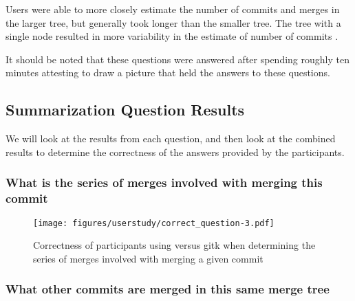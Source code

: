 Users were able to more closely estimate the number of commits and
merges in the larger tree, but generally took longer than the smaller
tree. The tree with a single node resulted in more variability in the
estimate of number of commits .

It should be noted that these questions were answered after spending
roughly ten minutes attesting to draw a picture that held the answers to
these questions.

\subsection{Summarization Question Results}

We will look at the results from each question, and then look at the
combined results to determine the correctness of the answers provided by
the participants.

\subsubsection{What is the series of merges involved with merging this commit}
\label{ssub:what_is_the_series_of_merges_involved_with_merging_this_commit}





\begin{figure}[htpb]
  \centering
  \texttt{[image: figures/userstudy/correct\_question-3.pdf]}
  \caption{Correctness of participants using \tool versus gitk
    when determining the series of merges involved with merging a given
  commit}
  \label{fig:figures/userstudy/correct_question-3}
\end{figure}

\subsubsection{What other commits are merged in this same merge tree}
\label{ssub:what_other_commits_are_merged_in_this_same_merge_tree}




